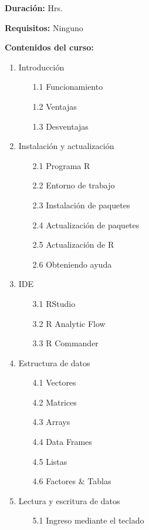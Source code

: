 \documentclass[12pt,a4paper,oneside]{article}\usepackage[]{graphicx}\usepackage[]{color}
\begin{document}
{\bf \large Duración:} Hrs.
  
{\bf \large Requisitos:}\newline
  Ninguno
  
{\bf \large Contenidos del curso:}

\begin{enumerate}
  \item {\Large Introducción}
  \begin{enumerate}
    \item[1.1] Funcionamiento
    \item[1.2] Ventajas
    \item[1.3] Desventajas
  \end{enumerate}
  \item {\Large Instalación y actualización}
  \begin{enumerate}
    \item[2.1] Programa R
    \item[2.2] Entorno de trabajo
    \item[2.3] Instalación de paquetes
    \item[2.4] Actualización de paquetes
    \item[2.5] Actualización de R
    \item[2.6] Obteniendo ayuda
  \end{enumerate}
  \item {\Large IDE}
  \begin{enumerate}
    \item[3.1] RStudio
    \item[3.2] R Analytic Flow
    \item[3.3] R Commander
  \end{enumerate}
  \item {\Large Estructura de datos}
    \begin{enumerate}
    \item[4.1] Vectores
    \item[4.2] Matrices
    \item[4.3] Arrays
    \item[4.4] Data Frames
    \item[4.5] Listas
    \item[4.6] Factores $\&$ Tablas
  \end{enumerate}
  \item {\Large Lectura y escritura de datos}
  \begin{enumerate}
    \item[5.1] Ingreso mediante el teclado

\end{enumerate}
\end{enumerate}
\end{document}
